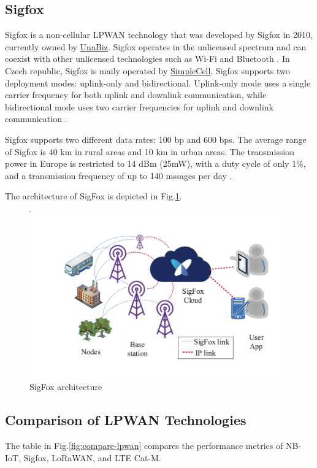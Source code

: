 \subsection{Sigfox}
Sigfox is a non-cellular LPWAN technology that was developed by Sigfox in 2010, currently owned by \href{https://www.unabiz.com/iot-connectivity/#sigfox}{UnaBiz}. Sigfox operates in the unlicensed spectrum and can coexist with other unlicensed
technologies such as Wi-Fi and Bluetooth \cite{sigfox-start}. In Czech republic, Sigfox is maily operated by \href{http://sigfox.cz/cs}{SimpleCell}. Sigfox supports two deployment modes: uplink-only and bidirectional. Uplink-only mode uses a single carrier frequency for both uplink and downlink communication, while bidirectional mode uses two carrier frequencies for uplink and downlink communication \cite{Mekki2018-overview-lpwan-tech}.

Sigfox supports two different data rates: 100 bp and 600 bps. The average range of Sigfox is 40 km in rural areas and 10 km in urban areas. The transmission power in Europe is restricted to 14 dBm (25mW), with a duty cycle of only 1\%, and a transmission frequency of up to 140 mssages per day \cite{sigfox-start}  \cite{petrariu_sigfox-study}. 

The architecture of SigFox is depicted in Fig.\ref{fig:sigfox-archt}.

\begin{figure}[h!]
    \centering
    \includegraphics[width=0.98\textwidth]{pict/sigfox-archt.png}
    \caption{SigFox architecture \cite{petrariu_sigfox-study}}
    \label{fig:sigfox-archt}
\end{figure}


\subsection{Comparison of LPWAN Technologies}
The table in Fig.\ref{fig:compare-lpwan} compares the performance metrics of NB-IoT, Sigfox, LoRaWAN, and LTE Cat-M.

